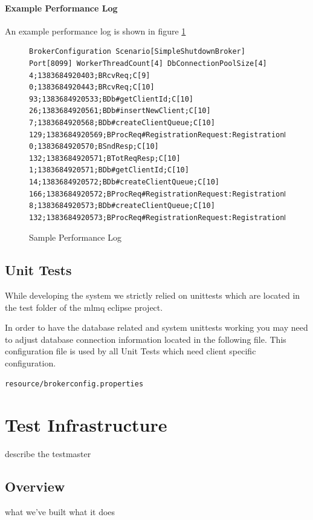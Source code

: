 \documentclass[a4paper]{article}
\begin{document}
\paragraph{Example Performance Log}
An example performance log is shown in figure \ref{fig:sample-perf-log}

\begin{figure}[H]
  \begin{center}
	\begin{verbatim}
BrokerConfiguration Scenario[SimpleShutdownBroker] Port[8099] WorkerThreadCount[4] DbConnectionPoolSize[4]
4;1383684920403;BRcvReq;C[9]
0;1383684920443;BRcvReq;C[10]
93;1383684920533;BDb#getClientId;C[10]
26;1383684920561;BDb#insertNewClient;C[10]
7;1383684920568;BDb#createClientQueue;C[10]
129;1383684920569;BProcReq#RegistrationRequest:RegistrationResponse;C[10]
0;1383684920570;BSndResp;C[10]
132;1383684920571;BTotReqResp;C[10]
1;1383684920571;BDb#getClientId;C[10]
14;1383684920572;BDb#createClientQueue;C[10]
166;1383684920572;BProcReq#RegistrationRequest:RegistrationResponse;C[10]
8;1383684920573;BDb#createClientQueue;C[10]
132;1383684920573;BProcReq#RegistrationRequest:RegistrationResponse;C[10]
	\end{verbatim}
  \end{center}
  \caption{Sample Performance Log}
  \label{fig:sample-perf-log}
\end{figure}

\subsection{Unit Tests}
While developing the system we strictly relied on unittests which are located in the test folder of the mlmq eclipse project.

In order to have the database related and system unittests working you may need to adjust database connection information located in the following file. This configuration file is used by all Unit Tests which need client specific configuration.

\begin{verbatim}
resource/brokerconfig.properties
\end{verbatim}

\section{Test Infrastructure}
describe the testmaster
\subsection{Overview}
what we've built
what it does
\end{document}
